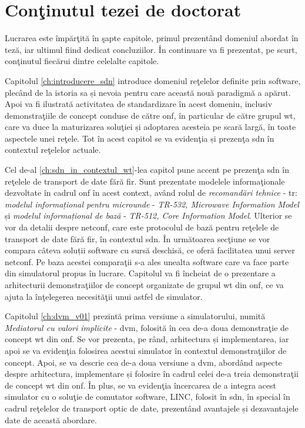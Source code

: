 \section{Conţinutul tezei de doctorat}

Lucrarea este împărţită în şapte capitole, primul prezentând domeniul abordat în teză, iar ultimul fiind dedicat concluziilor. În continuare va fi prezentat, pe scurt, conţinutul fiecărui dintre celelalte capitole.

Capitolul \ref{ch:introducere_sdn} introduce domeniul reţelelor definite prin software, plecând de la istoria sa și nevoia pentru care această nouă paradigmă a apărut. Apoi va fi ilustrată activitatea de standardizare în acest domeniu, inclusiv demonstraţiile de concept conduse de către \gls{onf}, în particular de către grupul \gls{wt}, care va duce la maturizarea soluţiei și adoptarea acesteia pe scară largă, în toate aspectele unei reţele. Tot în acest capitol se va evidenţia și prezenţa \gls{sdn} în contextul reţelelor actuale.

Cel de-al \ref{ch:sdn_in_contextul_wt}-lea capitol pune accent pe prezenţa \gls{sdn} în reţelele de transport de date fără fir. Sunt prezentate modelele informaţionale dezvoltate în cadrul \gls{onf} în acest context, având rolul de \textit{recomandări tehnice} - \gls{tr}: \textit{modelul informațional pentru microunde} - \textit{TR-532, Microwave Information Model} și \textit{modelul informațional de bază} - \textit{TR-512, Core Information Model}. Ulterior se vor da detalii despre \gls{netconf}, care este protocolul de bază pentru reţelele de transport de date fără fir, în contextul \gls{sdn}. În următoarea secţiune se vor compara câteva soluții software cu sursă deschisă, ce oferă facilitatea unui server \gls{netconf}. Pe baza acestei comparaţii s-a ales unealta software care va face parte din simulatorul propus în lucrare. Capitolul va fi încheiat de o prezentare a arhitecturii demonstraţiilor de concept organizate de grupul \gls{wt} din \gls{onf}, ce va ajuta la înţelegerea necesităţii unui astfel de simulator.

Capitolul \ref{ch:dvm_v01} prezintă prima versiune a simulatorului, numită \textit{Mediatorul cu valori implicite} - \gls{dvm}, folosită în cea de-a doua demonstraţie de concept \gls{wt} din \gls{onf}. Se vor prezenta, pe rând, arhitectura și implementarea, iar apoi se va evidenţia folosirea acestui simulator în contextul demonstraţiilor de concept. Apoi, se va descrie cea de-a doua versiune a \gls{dvm}, abordând aspecte despre arhitectura, implementare și folosire în cadrul celei de-a treia demonstraţii de concept \gls{wt} din \gls{onf}. În plus, se va evidenţia încercarea de a integra acest simulator cu o soluţie de comutator software, LINC, folosit în \gls{sdn}, în special în cadrul reţelelor de transport optic de date, prezentând avantajele și dezavantajele date de această abordare.

